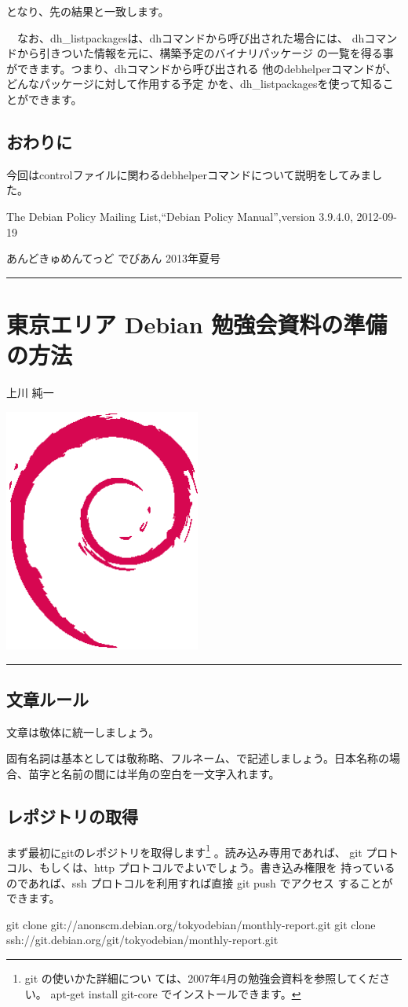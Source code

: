 \documentclass[mingoth,a4paper]{jsarticle}
\renewcommand{\dancersection}[2]{%
\newpage
あんどきゅめんてっど でびあん 2013年夏号
%
\vspace{0.1mm}\\
{\color{dancerdarkblue}\rule{\hsize}{2mm}}

%
%
\begin{minipage}[t]{0.6\hsize}
\color{dancerdarkblue}
\vspace{1cm}
\section{#1}
\hfill{}#2\\
\end{minipage}
\begin{minipage}[t]{0.4\hsize}
\vspace{-2cm}
\hfill{}\includegraphics[height=8cm]{image200502/openlogo-nd.eps}\\
\vspace{-5cm}
\end{minipage}
%
{\color{dancerlightblue}\rule{0.66\hsize}{2mm}}
%
\vspace{2cm}
}
\begin{document}
となり、先の結果と一致します。

　なお、dh\_listpackagesは、dhコマンドから呼び出された場合には、
dhコマンドから引きついた情報を元に、構築予定のバイナリパッケージ
の一覧を得る事ができます。つまり、dhコマンドから呼び出される
他のdebhelperコマンドが、どんなパッケージに対して作用する予定
かを、dh\_listpackagesを使って知ることができます。

\subsection{おわりに}

 今回はcontrolファイルに関わるdebhelperコマンドについて説明をしてみました。

\begin{thebibliography}{99}
 The Debian Policy Mailing List,``Debian Policy Manual'',version 3.9.4.0, 2012-09-19
\end{thebibliography}

\dancersection{東京エリア Debian 勉強会資料の準備の方法}{上川 純一}
\label{sec:debmtg2012howtoprepare}

\subsection{文章ルール}

文章は敬体に統一しましょう。

固有名詞は基本としては敬称略、フルネーム、で記述しましょう。日本名称の場
合、苗字と名前の間には半角の空白を一文字入れます。

\subsection{レポジトリの取得}

まず最初にgitのレポジトリを取得します\footnote{git の使いかた詳細につい
ては、2007年4月の勉強会資料を参照してください。 apt-get install git-core
でインストールできます。} 。読み込み専用であれば、
git プロトコル、もしくは、http プロトコルでよいでしょう。書き込み権限を
持っているのであれば、ssh プロトコルを利用すれば直接 git push でアクセス
することができます。

\begin{commandline}
 git clone git://anonscm.debian.org/tokyodebian/monthly-report.git
 git clone ssh://git.debian.org/git/tokyodebian/monthly-report.git
\end{commandline}
\end{document}
